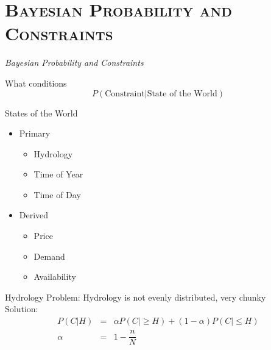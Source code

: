 \documentclass[xcolor=x11names,compress]{beamer}
\renewcommand{\(}{\begin{columns}}
\renewcommand{\)}{\end{columns}}
\newcommand{\<}[1]{\begin{column}{#1}}
\renewcommand{\>}{\end{column}}
\begin{document}
\section{\scshape Bayesian Probability and Constraints}
\begin{frame}
\vspace{1.5cm}
\begin{center}
{\Huge\textit{Bayesian Probability and Constraints}}
\end{center}
\end{frame}

\begin{frame}{What conditions}
\Large
\begin{equation*}
P( \text{Constraint} | \text{State of the World} )
\end{equation*}
\end{frame}


\begin{frame}{States of the World}
\begin{itemize}
\item Primary
\begin{itemize}
\item Hydrology
\item Time of Year
\item Time of Day
\end{itemize}
\item Derived
\begin{itemize}
\item Price
\item Demand
\item Availability
\end{itemize}
\end{itemize}
\end{frame}

\begin{frame}{Hydrology}
Problem: Hydrology is not evenly distributed, very chunky \\
Solution: \\
\begin{eqnarray*}
P(C | H) &=& \alpha P(C | \ge H) + (1 - \alpha) P (C | \le H) \\
\alpha &=& 1 - \dfrac{n}{N}
\end{eqnarray*}
\end{frame}
\end{document}
